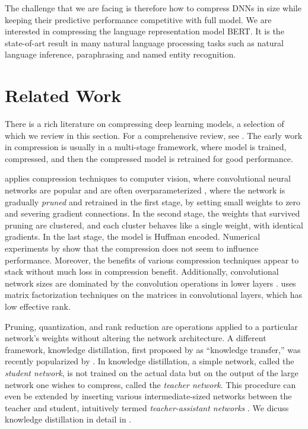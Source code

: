 \documentclass[10pt]{article}
\begin{document}
The challenge that we are facing is therefore how to compress DNNs in size
while keeping their predictive performance competitive with full model. We are interested in compressing the language representation model BERT.  It is the state-of-art result in many natural
language processing tasks  such as natural language inference, paraphrasing
and named entity recognition.


\section{Related Work}

There is a rich literature on compressing deep learning models, a selection
of which we review in this section. For a comprehensive review, see  
\citep{cheng2017survey}. The early work in compression is usually in a
multi-stage framework, where model is trained, compressed, and then
the compressed model is retrained for good performance. 

\citet{han2015deep} applies compression techniques to computer vision, where
convolutional neural networks are popular and are often overparameterized
\citep{yang2019fsnet}, where the network is gradually \emph{pruned} and
retrained in the first stage, by setting small weights to zero and severing
gradient connections. In the second stage, the weights that survived pruning are
clustered, and each cluster behaves like a single weight, with identical
gradients. In the last stage, the model is Huffman encoded. Numerical
experiments by \citet{han2015deep} show that the compression does not seem to
influence performance. Moreover, the benefits of various compression techniques
appear to stack without much loss in compression benefit. Additionally,
convolutional network sizes are dominated by the convolution operations in lower
layers \citep{denton2014exploiting}. \citet{denton2014exploiting} uses matrix
factorization techniques on the matrices in convolutional layers, which has low
effective rank.

Pruning, quantization, and rank reduction are operations applied to a
particular network's weights without altering the network architecture. 
A different framework, knowledge distillation, first proposed by 
\citep{bucilua2006model} as
``knowledge transfer,'' was recently popularized by
\citep{hinton2015distilling}. In knowledge distillation, a simple network,
called the \emph{student network}, is not trained on the actual data but on
the output of the large network one wishes to compress, called the 
\emph{teacher network}. This procedure can even be extended by inserting
various
intermediate-sized networks between the teacher and student, intuitively
termed
\emph{teacher-assistant networks} \citep{mirzadeh2019improved}. We dicuss
knowledge distillation in detail in .
\end{document}
